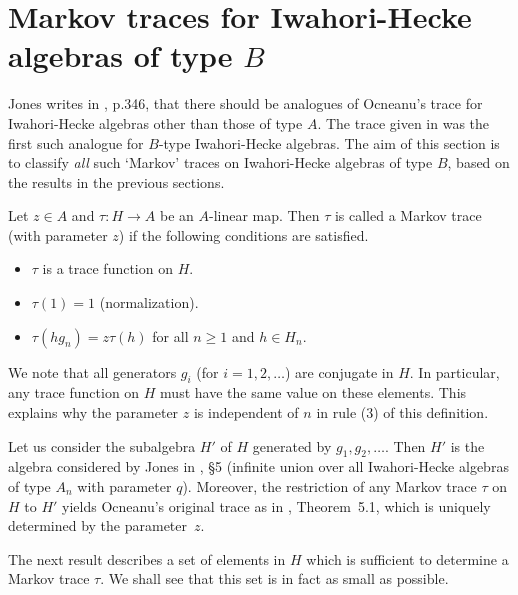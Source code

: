 \section{Markov traces for Iwahori-Hecke algebras of type $B$}

Jones writes in \cite{Jones}, p.346, that there should be analogues of
Ocneanu's trace for  Iwahori-Hecke  algebras other than those  of type
$A$. The  trace given  in \cite{L2} was  the  first such  analogue for
$B$-type  Iwahori-Hecke   algebras.  The  aim of  this   section is to
classify  {\it all} such  `Markov' traces on Iwahori-Hecke algebras of
type $B$, based on the results in the previous sections.

\begin{defn} 
Let $z \in A$ and $\tau:H \rightarrow A$ be an $A$-linear map. Then $\tau$
is called a Markov trace (with parameter $z$) if the following conditions 
are satisfied.
\begin{itemize}
\item[(1)] $\tau$ is a trace function on $H$.
\item[(2)] $\tau(1)=1$ (normalization).
\item[(3)] $\tau(hg_n)=z\tau(h)$ for all $n \geq 1$ and $h \in H_n$.
\end{itemize}
\end{defn}

\noindent We note that all generators $g_i$ (for $i=1,2,\ldots$) are 
conjugate in $H$. In particular, any trace function on $H$ must have the 
same value on these elements. This explains why the parameter $z$ is 
independent of $n$ in rule (3) of this definition. 

Let   us  consider    the  subalgebra   $H'$ of    $H$  generated   by
$g_1,g_2,\ldots$.   Then  $H'$ is  the algebra  considered by Jones in
\cite{Jones}, \S 5 (infinite  union over all Iwahori-Hecke algebras of
type  $A_n$ with parameter  $q$).   Moreover, the restriction of  any
Markov trace $\tau$ on $H$ to $H'$  yields Ocneanu's original trace as
in  \cite{Jones},  Theorem~5.1,  which is uniquely   determined by the
parameter~$z$.

The next result describes a set of elements in $H$ which is sufficient
to determine a  Markov trace $\tau$. We shall see that this set
is in fact as small as possible.

